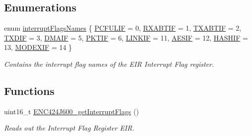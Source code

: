 \subsection*{Enumerations}
\begin{DoxyCompactItemize}
\item 
enum \mbox{\hyperlink{group__interrupts_gaf692e993b72f242633eee1b443276547}{interrupt\+Flags\+Names}} \{ \newline
\mbox{\hyperlink{group__interrupts_ggaf692e993b72f242633eee1b443276547a763a1fb486fd541369f9f91f63d11b2f}{P\+C\+F\+U\+L\+IF}} = 0, 
\mbox{\hyperlink{group__interrupts_ggaf692e993b72f242633eee1b443276547a12b452970825109f1b21fccae81f8f55}{R\+X\+A\+B\+T\+IF}} = 1, 
\mbox{\hyperlink{group__interrupts_ggaf692e993b72f242633eee1b443276547abfa00fdc147b153f1960d9f5d2fceb3c}{T\+X\+A\+B\+T\+IF}} = 2, 
\mbox{\hyperlink{group__interrupts_ggaf692e993b72f242633eee1b443276547aac1a991d894a8d498f3acdade862ed91}{T\+X\+D\+IF}} = 3, 
\newline
\mbox{\hyperlink{group__interrupts_ggaf692e993b72f242633eee1b443276547ac04c287b57604b5412cf577e2eea905d}{D\+M\+A\+IF}} = 5, 
\mbox{\hyperlink{group__interrupts_ggaf692e993b72f242633eee1b443276547aecae98f658eb2390e4b15d4090cfeeca}{P\+K\+T\+IF}} = 6, 
\mbox{\hyperlink{group__interrupts_ggaf692e993b72f242633eee1b443276547a5ab1928649db29845f7a4babb4ac77f7}{L\+I\+N\+K\+IF}} = 11, 
\mbox{\hyperlink{group__interrupts_ggaf692e993b72f242633eee1b443276547a9b506f9b2df930e94292700edcb2ffd9}{A\+E\+S\+IF}} = 12, 
\newline
\mbox{\hyperlink{group__interrupts_ggaf692e993b72f242633eee1b443276547ac37501e8ba38e4372e96790a31789343}{H\+A\+S\+H\+IF}} = 13, 
\mbox{\hyperlink{group__interrupts_ggaf692e993b72f242633eee1b443276547af47f70f60bd411fd450248cb098df3b4}{M\+O\+D\+E\+X\+IF}} = 14
 \}
\begin{DoxyCompactList}\small\item\em Contains the interrupt flag names of the E\+IR Interrupt Flag register. \end{DoxyCompactList}\end{DoxyCompactItemize}
\subsection*{Functions}
\begin{DoxyCompactItemize}
\item 
uint16\+\_\+t \mbox{\hyperlink{group__interrupts_ga624b3a45566e56aa688ebb70ad4387da}{E\+N\+C424\+J600\+\_\+get\+Interrupt\+Flags}} ()
\begin{DoxyCompactList}\small\item\em Reads out the Interrupt Flag Register E\+IR. \end{DoxyCompactList}\end{DoxyCompactItemize}


